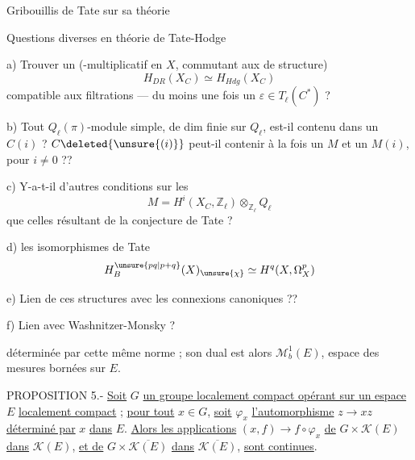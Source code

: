 
Gribouillis de Tate
sur sa théorie



Questions diverses en
théorie de Tate-Hodge



\uline{} a) Trouver un 
(-multiplicatif en $X$,  commutant aux  de structure)
\[
H_{DR}(X_C) \simeq H_{Hdg}(X_C)
\]
compatible aux filtrations --- du moins une fois  un  $\varepsilon\in T_\ell(C^*)$ ? 

b) Tout $Q_\ell(\pi)$-module simple, de dim finie sur $Q_\ell$, est-il contenu dans un $C(i)$ ?
$C\deleted{\unsure{(i)}}$ peut-il contenir à la fois un $M$ et un $M(i)$, pour $i\ne0$ ??

c) Y-a-t-il d'autres conditions sur les
\[
M=H^i(X_C,\mathbb Z_\ell)\otimes_{\mathbb Z_\ell}Q_\ell
\]
que celles résultant de la conjecture de Tate ?

d) \uline{} les isomorphismes de Tate
\[
H_B^{\unsure{pq|p+q}}(X)_{\unsure{\chi}}\simeq H^q(X,\Omega_X^p)
\]

e) Lien de  ces structures avec les connexions canoniques ??

f) Lien avec Washnitzer-Monsky ?



déterminée par cette même norme ; son dual est alors $\mathcal M_b^1(E)$, espace des mesures bornées sur $E$.

PROPOSITION 5.- \uline{Soit} $G$ \uline{un groupe localement compact opérant sur un espace} $E$ \uline{localement compact} ; \uline{pour tout} $x\in G$, \uline{soit} $\varphi_x$ \uline{l'automorphisme} $z\to xz$ \uline{déterminé par} $x$ \uline{dans} $E$. \uline{Alors les applications} $(x,f)\to f\circ\varphi_x$ \uline{de} $G\times\mathcal K(E)$ \uline{dans} $\mathcal K(E)$, \uline{et de} $G\times\overline{\mathcal K(E)}$ \uline{dans} $\overline{\mathcal K(E)}$, \uline{sont continues}.


